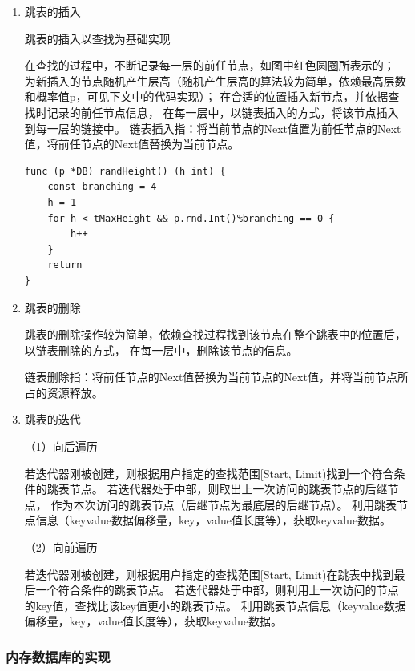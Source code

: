 \begin{enumerate}
		\item 跳表的插入
		
		跳表的插入以查找为基础实现


		在查找的过程中，不断记录每一层的前任节点，如图中红色圆圈所表示的；
		为新插入的节点随机产生层高（随机产生层高的算法较为简单，依赖最高层数和概率值p，可见下文中的代码实现）；
		在合适的位置插入新节点，并依据查找时记录的前任节点信息，
		在每一层中，以链表插入的方式，将该节点插入到每一层的链接中。
		链表插入指：将当前节点的Next值置为前任节点的Next值，将前任节点的Next值替换为当前节点。

		\begin{lstlisting}[caption=skiplistRandHeight , label=code_radds_storage_skiplist_randHeight]
func (p *DB) randHeight() (h int) {
	const branching = 4
	h = 1
	for h < tMaxHeight && p.rnd.Int()%branching == 0 {
		h++
	}
	return
}	
		\end{lstlisting}

		\item 跳表的删除

		跳表的删除操作较为简单，依赖查找过程找到该节点在整个跳表中的位置后，以链表删除的方式，
		在每一层中，删除该节点的信息。

		链表删除指：将前任节点的Next值替换为当前节点的Next值，并将当前节点所占的资源释放。

		\item 跳表的迭代
		
		（1）向后遍历

		若迭代器刚被创建，则根据用户指定的查找范围[Start, Limit)找到一个符合条件的跳表节点。
		若迭代器处于中部，则取出上一次访问的跳表节点的后继节点，
		作为本次访问的跳表节点（后继节点为最底层的后继节点）。
		利用跳表节点信息（keyvalue数据偏移量，key，value值长度等），获取keyvalue数据。
		
		（2）向前遍历

		若迭代器刚被创建，则根据用户指定的查找范围[Start, Limit)在跳表中找到最后一个符合条件的跳表节点。
		若迭代器处于中部，则利用上一次访问的节点的key值，查找比该key值更小的跳表节点。
		利用跳表节点信息（keyvalue数据偏移量，key，value值长度等），获取keyvalue数据。

	\end{enumerate}

		\subsubsection{内存数据库的实现}


